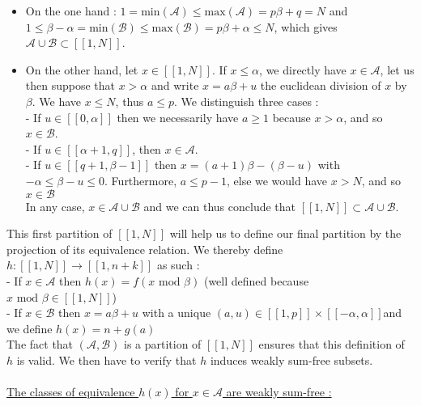 \begin{itemize}
	\item On the one hand : \(1 = \text{min}(\mathcal{A}) \leqslant \text{max}(\mathcal{A}) = p\beta + q = N\) and
\(1 \leqslant \beta - \alpha = \text{min}(\mathcal{B}) \leqslant \text{max}(\mathcal{B}) = p\beta + \alpha \leqslant
N\),
	which gives \(\mathcal{A} \cup \mathcal{B} \subset [\![1,N]\!]\).
\item On the other hand, let \(x \in [\![1,N]\!]\). If \(x \leqslant \alpha\), we directly have \(x \in \mathcal{A}\),
let us then suppose that \(x > \alpha\) and write \(x = a\beta + u\)
the euclidean division of \(x\) by \(\beta\). We have \(x \leqslant N\), thus \(a \leqslant p\). We distinguish three
cases : \\
- If \(u \in [\![0,\alpha]\!]\) then we necessarily have \(a \geqslant 1\) because \(x > \alpha\), and so \(x \in
\mathcal{B}\).\\
	- If \(u \in [\![\alpha + 1,q]\!]\), then \(x \in \mathcal{A}\). \\
- If \(u \in [\![q + 1,\beta - 1]\!]\) then \(x = (a+1)\beta - (\beta - u)\) with \(-\alpha \leqslant \beta - u
\leqslant 0\).
	Furthermore, \(a \leqslant p - 1\), else we would have \(x > N\), and so \(x \in \mathcal{B}\) \\
In any case, \(x \in \mathcal{A} \cup \mathcal{B}\) and we can thus conclude that \([\![1,N]\!] \subset \mathcal{A}
\cup\mathcal{B}\).
\end{itemize}
This first partition of \([\![1,N]\!]\) will help us to define our final partition by the projection of its equivalence
relation.
We thereby define \(h : [\![1,N]\!] \longrightarrow [\![1,n+k]\!]\) as such :\\
- If \(x \in \mathcal{A}\) then \(h(x) = f(x \text{ mod } \beta)\) (well defined because \(x \text{ mod } \beta \in
[\![1,N]\!]\))\\
- If \(x \in \mathcal{B}\) then \(x = a\beta + u\) with a unique \((a,u) \in [\![1,p]\!] \times
[\![-\alpha,\alpha]\!]\)and we define \(h(x) = n + g(a)\)\\
The fact that \((\mathcal{A}, \mathcal{B})\) is a partition of \([\![1,N]\!]\) ensures that this definition of \(h\) is
valid. We then have to verify that \(h\) induces weakly sum-free subsets.\\
\\
\underline{The classes of equivalence \(h(x)\) for \(x \in \mathcal{A}\) are weakly sum-free :}
\\
\\
